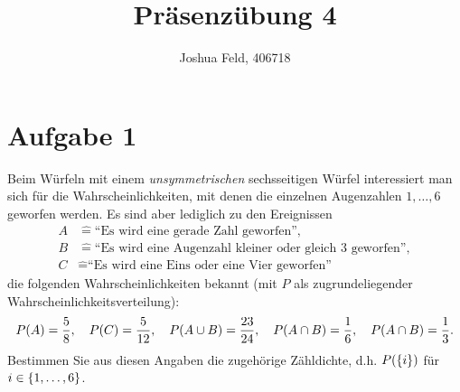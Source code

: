\documentclass{exercise}
\institute{Institut für Statistik und Wirtschaftsmathematik}
\title{Präsenzübung 4}
\author{Joshua Feld, 406718}
\begin{document}
    \maketitle


    \section*{Aufgabe 1}

    \begin{problem}
        Beim Würfeln mit einem \emph{unsymmetrischen} sechsseitigen Würfel interessiert man sich für die Wahrscheinlichkeiten, mit denen die einzelnen Augenzahlen \(1, \ldots, 6\) geworfen werden.
        Es sind aber lediglich zu den Ereignissen
        \begin{align*}
            A &\hat{=} \text{``Es wird eine gerade Zahl geworfen''},\\
            B &\hat{=} \text{``Es wird eine Augenzahl kleiner oder gleich }3\text{ geworfen''},\\
            C &\hat{=} \text{``Es wird eine Eins oder eine Vier geworfen''}
        \end{align*}
        die folgenden Wahrscheinlichkeiten bekannt (mit \(P\) als zugrundeliegender Wahrscheinlichkeitsverteilung):
        \[
            P\parentheses*{A} = \frac{5}{8}, \quad P\parentheses*{C} = \frac{5}{12}, \quad P\parentheses*{A \cup B} = \frac{23}{24}, \quad P\parentheses*{A \cap B} = \frac{1}{6}, \quad P\parentheses*{A \cap B} = \frac{1}{3}.
        \]
        Bestimmen Sie aus diesen Angaben die zugehörige Zähldichte, d.h. \(P\parentheses*{\braces*{i}}\) für \(i \in \braces*{1, \ldots, 6}\).
    \end{problem}
\end{document}
